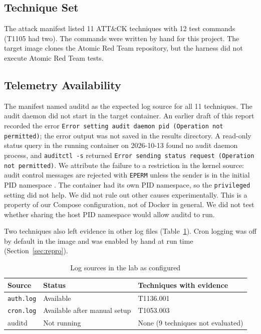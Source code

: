 \documentclass[11pt,a4paper]{article}
\begin{document}
\subsection{Technique Set}

The attack manifest listed 11 ATT\&CK techniques with 12 test commands (T1105
had two). The commands were written by hand for this project. The target image
clones the Atomic Red Team repository, but the harness did not execute Atomic
Red Team tests.

\subsection{Telemetry Availability}
\label{sec:telemetry}

The manifest named auditd as the expected log source for all 11 techniques.
The audit daemon did not start in the target container. An earlier draft of
this report recorded the error \texttt{Error setting audit daemon pid
(Operation not permitted)}; the error output was not saved in the results
directory. A read-only status query in the running container on 2026-10-13
found no audit daemon process, and \texttt{auditctl -s} returned
\texttt{Error sending status request (Operation not permitted)}. We attribute
the failure to a restriction in the kernel source: audit control
messages are rejected with \texttt{EPERM} unless the sender is in the initial
PID namespace \cite{linux-audit}. The container had its own PID namespace, so
the \texttt{privileged} setting did not help. We did not rule out other causes
experimentally. This is a property of our
Compose configuration, not of Docker in general. We did not test whether
sharing the host PID namespace would allow auditd to run.

Two techniques also left evidence in other log files
(Table~\ref{tab:sources}). Cron logging was off by default in the image and
was enabled by hand at run time (Section~\ref{sec:repro}).

\begin{table}[H]
    \centering
    \caption{Log sources in the lab as configured}
    \label{tab:sources}
    \begin{tabular}{lll}
        \toprule
        \textbf{Source} & \textbf{Status} & \textbf{Techniques with evidence} \\
        \midrule
        \texttt{auth.log} & Available & T1136.001 \\
        \texttt{cron.log} & Available after manual setup & T1053.003 \\
        auditd & Not running & None (9 techniques not evaluated) \\
        \bottomrule
    \end{tabular}
\end{table}
\end{document}
